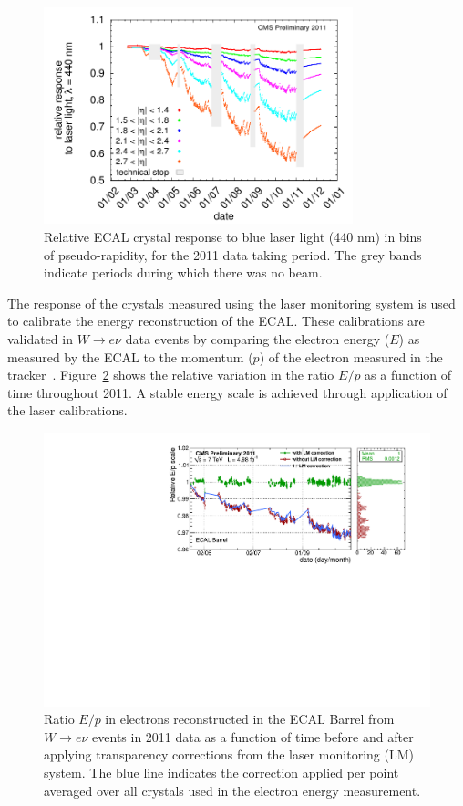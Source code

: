 \begin{figure}
	\centering
	\includegraphics[width=0.8\textwidth]{detector/ecal/laser.pdf}
	\caption{Relative ECAL crystal response to blue laser light (440 nm) in bins of pseudo-rapidity, 
	for the 2011 data taking period. The grey bands indicate periods during which there was no beam.}
	\label{fig:trans}
\end{figure}

The response of the crystals measured using the laser monitoring system is used to calibrate 
the energy reconstruction of the ECAL. These calibrations are validated in $W\rightarrow e\nu$ data events
by comparing the electron energy ($E$) as measured by the ECAL to the momentum 
($p$) of the electron measured in the tracker~\citep{CMS-DP-2012-007}. 
Figure~\ref{fig:scaleeop} shows the relative variation in the ratio $E/p$ as a function of time 
throughout 2011. A stable energy scale is achieved through application of the laser calibrations.

\begin{figure}
	\centering
	\includegraphics[width=\textwidth]{detector/ecal/scaleeop.pdf}
	\caption{Ratio $E/p$ in electrons reconstructed in the ECAL Barrel 
	from $W\rightarrow e\nu$ events in 2011 data as a function of time before 
	and after applying transparency corrections from the laser monitoring (LM) system. 
	The blue line indicates the correction applied per point averaged over all crystals used in the electron
	energy measurement.}
	\label{fig:scaleeop}
\end{figure}

